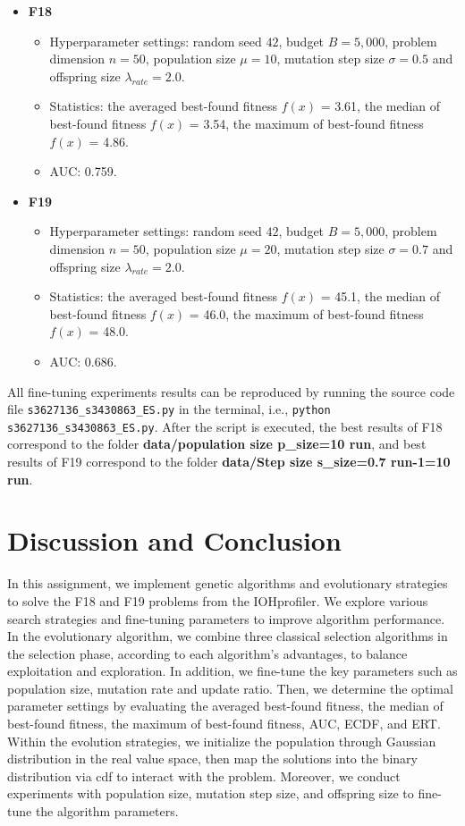 \documentclass{article}
\begin{document}
\begin{itemize}
    \item \textbf{F18}
        \begin{itemize}
            \item Hyperparameter settings: random seed $42$, budget $B = 5,000$, problem dimension $n = 50$, population size $\mu = 10$, mutation step size $\sigma = 0.5$ and offspring size $\lambda_{rate} = 2.0$.
            \item Statistics: the averaged best-found fitness $f(x)$ = 3.61, the median of best-found fitness $f(x)$ = 3.54, the maximum of best-found fitness $f(x)$ = 4.86.
            \item AUC: 0.759.
        \end{itemize}
    \item \textbf{F19}
        \begin{itemize}
            \item Hyperparameter settings: random seed $42$, budget $B = 5,000$, problem dimension $n = 50$, population size $\mu = 20$, mutation step size $\sigma = 0.7$ and offspring size $\lambda_{rate} = 2.0$.
            \item Statistics: the averaged best-found fitness $f(x)$ = 45.1, the median of best-found fitness $f(x)$ = 46.0, the maximum of best-found fitness $f(x)$ = 48.0.
            \item AUC: 0.686.
        \end{itemize}
\end{itemize}

 All fine-tuning experiments results can be reproduced by running the source code file \texttt{s3627136\_s3430863\_ES.py} in the terminal, i.e., \texttt{python s3627136\_s3430863\_ES.py}. After the script is executed, the best results of F18 correspond to the folder \textbf{data/population size p\_size=10 run}, and best results of F19 correspond to the folder \textbf{data/Step size s\_size=0.7 run-1=10 run}.


\section{Discussion and Conclusion}
\label{sec:dis&res}
In this assignment, we implement genetic algorithms and evolutionary strategies to solve the F18 and F19 problems from the IOHprofiler. We explore various search strategies and fine-tuning parameters to improve algorithm performance. In the evolutionary algorithm, we combine three classical selection algorithms in the selection phase, according to each algorithm's advantages, to balance exploitation and exploration. In addition, we fine-tune the key parameters such as population size, mutation rate and update ratio. Then, we determine the optimal parameter settings by evaluating the averaged best-found fitness, the median of best-found fitness, the maximum of best-found fitness, AUC, ECDF, and ERT. Within the evolution strategies, we initialize the population through Gaussian distribution in the real value space, then map the solutions into the binary distribution via cdf to interact with the problem. Moreover, we conduct experiments with population size, mutation step size, and offspring size to fine-tune the algorithm parameters.
 
\end{document}

